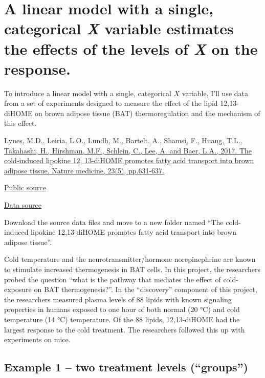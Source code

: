 \documentclass[]{book}
\begin{document}
\hypertarget{a-linear-model-with-a-single-categorical-x-variable-estimates-the-effects-of-the-levels-of-x-on-the-response.}{%
\section{\texorpdfstring{A linear model with a single, categorical \emph{X} variable estimates the effects of the levels of \emph{X} on the response.}{A linear model with a single, categorical X variable estimates the effects of the levels of X on the response.}}\label{a-linear-model-with-a-single-categorical-x-variable-estimates-the-effects-of-the-levels-of-x-on-the-response.}}

To introduce a linear model with a single, categorical \(X\) variable, I'll use data from a set of experiments designed to measure the effect of the lipid 12,13-diHOME on brown adipose tissue (BAT) thermoregulation and the mechanism of this effect.

\href{https://www.nature.com/articles/nm.4297}{Lynes, M.D., Leiria, L.O., Lundh, M., Bartelt, A., Shamsi, F., Huang, T.L., Takahashi, H., Hirshman, M.F., Schlein, C., Lee, A. and Baer, L.A., 2017. The cold-induced lipokine 12, 13-diHOME promotes fatty acid transport into brown adipose tissue. Nature medicine, 23(5), pp.631-637.}

\href{https://www.ncbi.nlm.nih.gov/pmc/articles/PMC5699924/pdf/nihms916046.pdf}{Public source}

\href{https://www.nature.com/articles/nm.4297\#Sec14}{Data source}

Download the source data files and move to a new folder named ``The cold-induced lipokine 12,13-diHOME promotes fatty acid transport into brown adipose tissue''.

Cold temperature and the neurotransmitter/hormone norepinephrine are known to stimulate increased thermogenesis in BAT cells. In this project, the researchers probed the question ``what is the pathway that mediates the effect of cold-exposure on BAT thermogenesis?''. In the ``discovery'' component of this project, the researchers measured plasma levels of 88 lipids with known signaling properties in humans exposed to one hour of both normal (20 °C) and cold temperature (14 °C) temperature. Of the 88 lipids, 12,13-diHOME had the largest response to the cold treatment. The researchers followed this up with experiments on mice.

\hypertarget{example-1-two-treatment-levels-groups}{%
\subsection{Example 1 -- two treatment levels (``groups'')}\label{example-1-two-treatment-levels-groups}}
\end{document}
